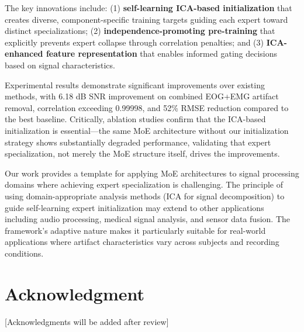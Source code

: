 \documentclass[journal]{IEEEtran}
\begin{document}
The key innovations include: (1) \textbf{self-learning ICA-based initialization} that creates diverse, component-specific training targets guiding each expert toward distinct specializations; (2) \textbf{independence-promoting pre-training} that explicitly prevents expert collapse through correlation penalties; and (3) \textbf{ICA-enhanced feature representation} that enables informed gating decisions based on signal characteristics.

Experimental results demonstrate significant improvements over existing methods, with 6.18 dB SNR improvement on combined EOG+EMG artifact removal, correlation exceeding 0.99998, and 52\% RMSE reduction compared to the best baseline. Critically, ablation studies confirm that the ICA-based initialization is essential---the same MoE architecture without our initialization strategy shows substantially degraded performance, validating that expert specialization, not merely the MoE structure itself, drives the improvements.

Our work provides a template for applying MoE architectures to signal processing domains where achieving expert specialization is challenging. The principle of using domain-appropriate analysis methods (ICA for signal decomposition) to guide self-learning expert initialization may extend to other applications including audio processing, medical signal analysis, and sensor data fusion. The framework's adaptive nature makes it particularly suitable for real-world applications where artifact characteristics vary across subjects and recording conditions.

\section*{Acknowledgment}

[Acknowledgments will be added after review]


\end{document}
